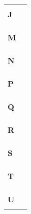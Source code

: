 \begin{longtable}{p{2.5cm}p{9.5cm}}
\\
\\
\huge{\textbf{J}}& \\
\hline
\\

\\
\\
\huge{\textbf{M}}& \\
\hline
\\

\\
\\
\huge{\textbf{N}}& \\
\hline
\\

\\
\\
\huge{\textbf{P}}& \\
\hline
\\

\\
\\
\huge{\textbf{Q}}& \\
\hline
\\

\\
\\
\huge{\textbf{R}}& \\
\hline
\\

\\
\\
\huge{\textbf{S}}& \\
\hline
\\

\\
\\
\huge{\textbf{T}}& \\
\hline
\\

\\
\\
\huge{\textbf{U}}& \\
\hline
\\


\end{longtable}
